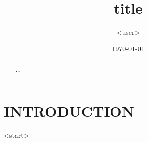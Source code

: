 \documentclass[reqno]{lanl}
\begin{document}

\title{title}
\author{<user>}
\address{X--TM, MS D409, Los Alamos National Laboratory, Los Alamos, NM
  87544}

\date{\today}

\begin{abstract}
...
\end{abstract}

\keywords{}
\maketitle


\section*{INTRODUCTION}

<start>




\end{document}

